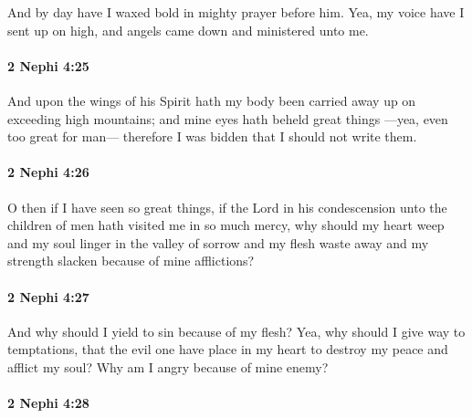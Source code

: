 			And by day have I waxed bold in mighty prayer before him.
			Yea, my voice have I sent up on high,
			and angels came down and ministered unto me.

		\paragraph{2 Nephi 4:25} %
			\label{2NEPHI-4-25}

			And upon the wings of his Spirit hath my body been carried
			away up on exceeding high mountains;
			and mine eyes hath beheld great things
			---yea, even too great for man---
			therefore I was bidden that I should not write them.

		\paragraph{2 Nephi 4:26} %
			\label{2NEPHI-4-26}

			O then if I have seen so great things,
			if the Lord in his condescension unto the children of men
			hath visited me in so much mercy,
			why should my heart weep
			and my soul linger in the valley of sorrow
			and my flesh waste away
			and my strength slacken because of mine afflictions?

		\paragraph{2 Nephi 4:27} %
			\label{2NEPHI-4-27}

			And why should I yield to sin because of my flesh?
			Yea, why should I give way to temptations,
			that the evil one have place in my heart
			to destroy my peace and afflict my soul?
			Why am I angry because of mine enemy?

		\paragraph{2 Nephi 4:28} %
			\label{2NEPHI-4-28}

